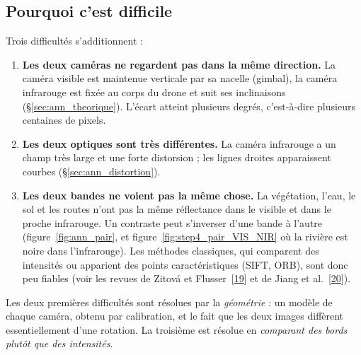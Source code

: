 \documentclass[a4paper,11pt]{report}
\begin{document}
\subsection{Pourquoi c'est difficile}
Trois difficultés s'additionnent :
\begin{enumerate}
	\item \textbf{Les deux caméras ne regardent pas dans la même direction.} La caméra visible est maintenue verticale par sa nacelle (gimbal), la caméra infrarouge est fixée au corps du drone et suit ses inclinaisons (§\ref{sec:ann_theorique}). L'écart atteint plusieurs degrés, c'est-à-dire plusieurs centaines de pixels.
	\item \textbf{Les deux optiques sont très différentes.} La caméra infrarouge a un champ très large et une forte distorsion ; les lignes droites apparaissent courbes (§\ref{sec:ann_distortion}).
	\item \textbf{Les deux bandes ne voient pas la même chose.} La végétation, l'eau, le sol et les routes n'ont pas la même réflectance dans le visible et dans le proche infrarouge. Un contraste peut s'inverser d'une bande à l'autre (figure~\ref{fig:ann_pair}, et figure~\ref{fig:step4_pair_VIS_NIR} où la rivière est noire dans l'infrarouge). Les méthodes classiques, qui comparent des intensités ou apparient des points caractéristiques (SIFT, ORB), sont donc peu fiables (voir les revues de Zitová et Flusser~[\hyperref[ann_zitova]{19}] et de Jiang et al.~[\hyperref[ann_jiang]{20}]).
\end{enumerate}
Les deux premières difficultés sont résolues par la \emph{géométrie} : un modèle de chaque caméra, obtenu par calibration, et le fait que les deux images diffèrent essentiellement d'une rotation. La troisième est résolue en \emph{comparant des bords plutôt que des intensités}.
\end{document}
